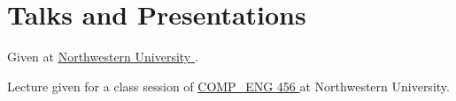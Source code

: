 \section{Talks and Presentations}

\resumeSubHeadingListStart


\vspace{2pt}

\hspace{12pt}
Given at
\href{https://www.mccormick.northwestern.edu/computer-science/news-events/news/articles/2023/showcase-highlights-undergraduate-student-summer-research-projects.html}{%
  \underline{Northwestern University}%
}.



\vspace{2pt}

\hspace{12pt}
Lecture given for a class session of
\href{https://www.mccormick.northwestern.edu/electrical-computer/academics/courses/descriptions/456.html}{%
  \underline{COMP\_ENG 456}%
} at Northwestern University.


\resumeSubHeadingListEnd


